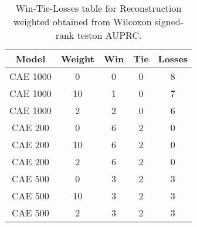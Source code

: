 \begin{table}[H]
\centering
\begin{tabular}{|c|c|c|c|c|}

\textbf{Model} & \textbf{Weight} &  \textbf{Win} &  \textbf{Tie} &  \textbf{Losses} \\
\hline

      CAE 1000 &               0 &             0 &             0 &                8 \\
\hline
      CAE 1000 &              10 &             1 &             0 &                7 \\
\hline
      CAE 1000 &               2 &             2 &             0 &                6 \\
\hline
       CAE 200 &               0 &             6 &             2 &                0 \\
\hline
       CAE 200 &              10 &             6 &             2 &                0 \\
\hline
       CAE 200 &               2 &             6 &             2 &                0 \\
\hline
       CAE 500 &               0 &             3 &             2 &                3 \\
\hline
       CAE 500 &              10 &             3 &             2 &                3 \\
\hline
       CAE 500 &               2 &             3 &             2 &                3 \\
\hline

\end{tabular}
\caption{Win-Tie-Losses table for Reconstruction weighted obtained from Wilcoxon signed-rank teston AUPRC.}
\label{tab:reconstruction_weighted_weighted_comparison_all}
\end{table}
